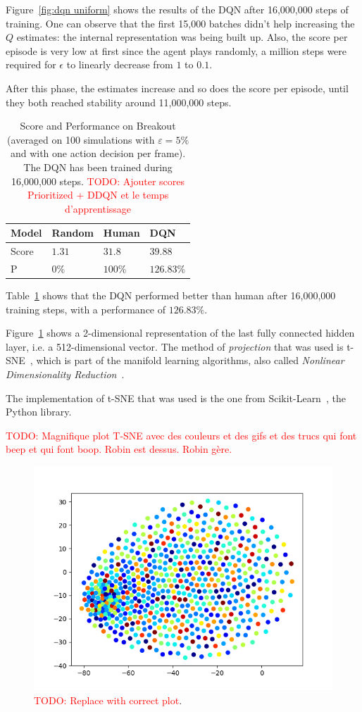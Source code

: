 \documentclass[letterpaper]{article}
\newcommand\todo[1]{\textcolor{red}{TODO: #1}}
\begin{document}
Figure~\ref{fig:dqn uniform} shows the results of the DQN after 16,000,000 steps of training. One can observe that the first 15,000 batches didn't help
increasing the $Q$ estimates: the internal representation was being built up. Also, the score per episode is very low at first since the agent plays
randomly, a million steps were required for $\epsilon$ to linearly decrease from $1$ to $0.1$.

After this phase, the estimates increase and so does the score per episode, until they both reached stability around 11,000,000 steps.

\begin{table}[!h]
	\centering
	\begin{tabular}{l|l|l|l}
		Model & Random & Human & DQN \\ \hline \hline
		Score & $1.31$ & $31.8$ & $39.88$ \\ \hline
		P &  $0\%$ & $100\%$ & $126.83\%$
	\end{tabular}
	\caption{Score and Performance on Breakout (averaged on 100 simulations with $\varepsilon=5\%$ and with one action decision per frame). The DQN has been
	trained during 16,000,000 steps.
	\todo{Ajouter scores Prioritized + DDQN et le temps d'apprentissage}\label{tab:scores breakout}}
\end{table}

Table~\ref{tab:scores breakout} shows that the DQN performed better than human after 16,000,000 training steps, with a performance of $126.83\%$.

Figure~\ref{fig:t-SNE DQN uniform} shows a 2-dimensional representation of the last fully connected hidden layer, i.e. a 512-dimensional
vector. The method of \textit{projection} that was used is t-SNE~\citep{maaten2008visualizing}, which is part of the manifold learning algorithms, also
called \textit{Nonlinear Dimensionality Reduction}~\citep{lee2007nonlinear}.

The implementation of t-SNE that was used is the one from Scikit-Learn~\citep{scikit-learn}, the Python library.

  \todo{Magnifique plot T-SNE avec des couleurs et des gifs et des trucs qui font beep et qui font boop. Robin est dessus. Robin gère.}~\citep{wattenberg2016how}

\begin{figure}
	\includegraphics[width=.5\textwidth]{figures/TSNE_dqn_uniform}
	\caption{\todo{Replace with correct plot}.\label{fig:t-SNE DQN uniform}}
\end{figure}
\end{document}
